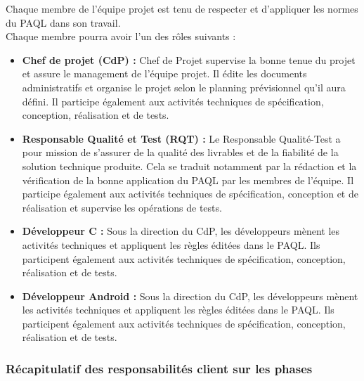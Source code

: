 \documentclass[a4paper,11pt,titlepage]{article}
\begin{document}
Chaque membre de l'équipe projet est tenu de respecter et d'appliquer les
normes du PAQL dans son travail.\\
Chaque membre pourra avoir l'un des rôles suivants :
\begin{itemize}
    \item \textbf{Chef de projet (CdP) :} Chef de Projet supervise la bonne tenue du
          projet et assure le management de l'équipe projet. Il édite les
          documents administratifs et organise le projet selon le planning
          prévisionnel qu'il aura défini. Il participe également aux activités techniques de
          spécification, conception, réalisation et de tests.
    \item \textbf{Responsable Qualité et Test (RQT) :}  Le Responsable Qualité-Test a pour
          mission de s'assurer de la qualité des livrables et de la fiabilité de la
          solution technique produite. Cela se traduit notamment par la rédaction
          et la vérification de la bonne application du PAQL par les membres de
          l'équipe. Il participe également aux activités techniques de spécification,
          conception et de réalisation et supervise les opérations de tests.
    \item \textbf{Développeur C :} Sous la direction du CdP, les développeurs
          mènent les activités techniques et appliquent les règles éditées dans le
          PAQL. Ils participent également aux activités techniques de spécification,
          conception, réalisation et de tests.
    \item \textbf{Développeur Android :} Sous la direction du CdP, les développeurs
          mènent les activités techniques et appliquent les règles éditées dans le
          PAQL. Ils participent également aux activités techniques de spécification,
          conception, réalisation et de tests.
\end{itemize}

\subsubsection{Récapitulatif des responsabilités client sur les phases} %
\end{document}
